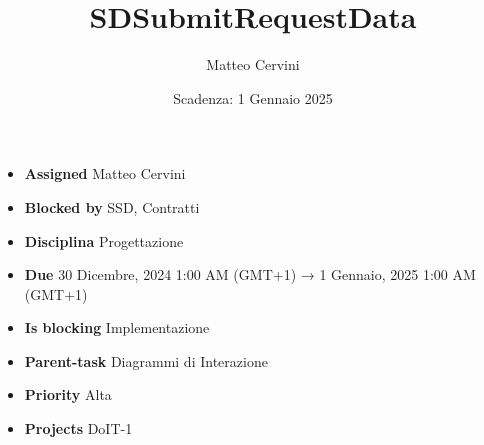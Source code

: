 \title{SDSubmitRequestData}
\author{Matteo Cervini}
\date{Scadenza: 1 Gennaio 2025}

\maketitle

\begin{itemize}
    \item \textbf{Assigned} Matteo Cervini
    \item \textbf{Blocked by} SSD, Contratti
    \item \textbf{Disciplina} Progettazione
    \item \textbf{Due} 30 Dicembre, 2024 1:00 AM (GMT+1) → 1 Gennaio, 2025 1:00 AM (GMT+1)
    \item \textbf{Is blocking} Implementazione
    \item \textbf{Parent-task} Diagrammi di Interazione
    \item \textbf{Priority} Alta
    \item \textbf{Projects} DoIT-1
\end{itemize}